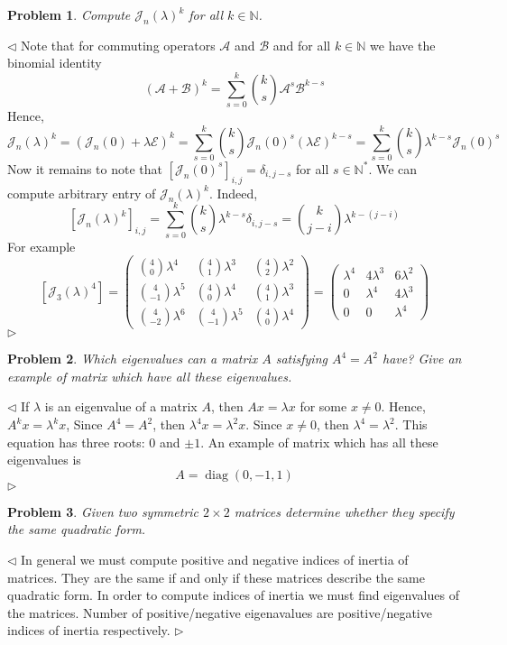 \documentclass[12pt]{article}
\newtheorem{problem}{Problem}[subsection]
\newenvironment{solution}{\par $\triangleleft$}{$\triangleright$}
\begin{document}
 
\begin{problem} Compute $\mathcal{J}_n(\lambda)^k$ for all $k\in\mathbb{N}$.
\end{problem}
\begin{solution} Note that for commuting operators $\mathcal{A}$ and $\mathcal{B}$ and for all $k\in\mathbb{N}$ we have the binomial identity
$$
(\mathcal{A}+\mathcal{B})^k=\sum_{s=0}^k \binom{k}{s}\mathcal{A}^s\mathcal{B}^{k-s}
$$
Hence,
$$
\mathcal{J}_n(\lambda)^k=(\mathcal{J}_n(0)+\lambda\mathcal{E})^k=\sum_{s=0}^k\binom{k}{s}\mathcal{J}_n(0)^s(\lambda\mathcal{E})^{k-s}=\sum_{s=0}^k\binom{k}{s}\lambda^{k-s}\mathcal{J}_n(0)^s
$$
Now it remains to note that $[\mathcal{J}_n(0)^s]_{i,j}=\delta_{i,j-s}$ for all $s\in\mathbb{N}^*$. We can compute arbitrary entry of $\mathcal{J}_n(\lambda)^k$. Indeed,
$$
[\mathcal{J}_n(\lambda)^k]_{i,j}=\sum_{s=0}^k\binom{k}{s}\lambda^{k-s}\delta_{i,j-s}=\binom{k}{j-i}\lambda^{k-(j-i)}
$$
For example 
$$
[\mathcal{J}_3(\lambda)^4]=
\begin{pmatrix} 
\binom{4}{0}\lambda^4 & \binom{4}{1}\lambda^3 & \binom{4}{2}\lambda^2\\
\binom{4}{-1}\lambda^5 & \binom{4}{0}\lambda^4 & \binom{4}{1}\lambda^3\\
\binom{4}{-2}\lambda^6 & \binom{4}{-1}\lambda^5 & \binom{4}{0}\lambda^4
\end{pmatrix}
=
\begin{pmatrix} 
\lambda^4 & 4\lambda^3 & 6\lambda^2\\
0 & \lambda^4 & 4\lambda^3\\
0 & 0 & \lambda^4
\end{pmatrix}
$$
\end{solution}
 
\begin{problem} Which eigenvalues can a matrix $A$ satisfying $A^4=A^2$ have? Give an example of matrix which have all these eigenvalues.
\end{problem}
\begin{solution} If $\lambda$ is an eigenvalue of a matrix $A$, then $Ax=\lambda x$ for some $x\neq 0$. Hence, $A^kx=\lambda^kx$, Since $A^4=A^2$, then $\lambda^4x=\lambda^2 x$. Since $x\neq 0$, then $\lambda^4=\lambda^2$. This equation has three roots: $0$ and $\pm 1$. An example of matrix which has all these eigenvalues is
$$
A=\operatorname{diag}(0,-1,1)
$$
\end{solution}
 
\begin{problem} Given two symmetric $2\times 2$ matrices determine whether they specify the same quadratic form.
\end{problem}
\begin{solution} In general we must compute positive and negative indices of inertia of matrices. They are the same if and only if these matrices describe the same quadratic form. In order to compute indices of inertia we must find eigenvalues of the matrices. Number of positive/negative eigenavalues are positive/negative indices of inertia respectively. 
\end{solution}
 
\end{document}
